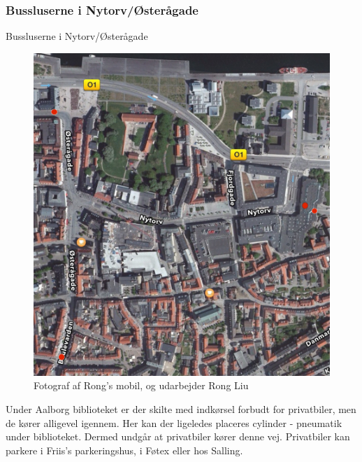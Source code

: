 \subsubsection{Bussluserne i Nytorv/Østerågade}
\label{subs:buslusnytorv}
{Bussluserne i Nytorv/Østerågade}
\label{sub:}
\begin{figure}[htbp]
  \centering
  \begin{adjustbox}{max width=\textwidth}
    \includegraphics{figures/Billederogfigur/2.jpg}
 \end{adjustbox}
  \caption{ Fotograf af Rong’s mobil, og udarbejder Rong Liu}
   \label{fig: Fotograf af Rong}
\end{figure}
                                        
Under Aalborg biblioteket er der skilte med indkørsel forbudt for privatbiler, men de kører alligevel igennem. Her kan der ligeledes placeres cylinder - pneumatik under biblioteket. Dermed undgår at privatbiler kører denne vej. Privatbiler kan parkere i Friis’s parkeringshus, i Føtex eller hos Salling.                         
                                                   
